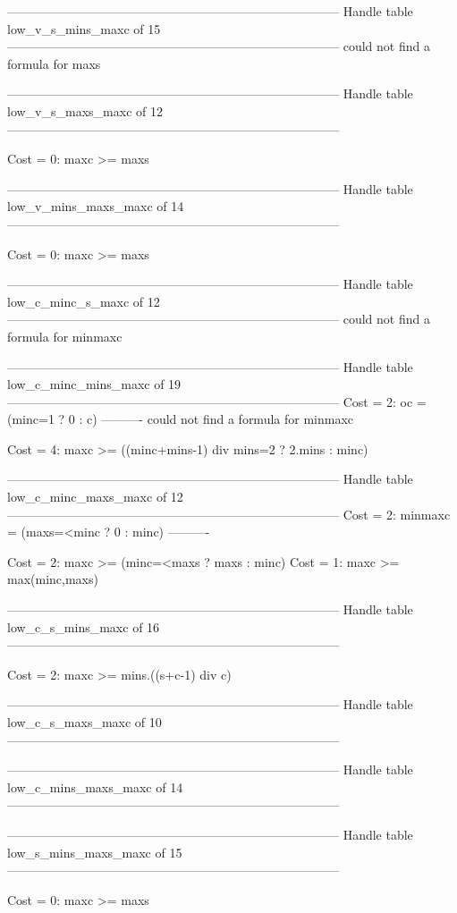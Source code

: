 --------------------------------------------------------------------------------
Handle table low_v_s_mins_maxc of 15
--------------------------------------------------------------------------------
could not find a formula for maxs


--------------------------------------------------------------------------------
Handle table low_v_s_maxs_maxc of 12
--------------------------------------------------------------------------------

Cost =  0:  maxc >= maxs

--------------------------------------------------------------------------------
Handle table low_v_mins_maxs_maxc of 14
--------------------------------------------------------------------------------

Cost =  0:  maxc >= maxs

--------------------------------------------------------------------------------
Handle table low_c_minc_s_maxc of 12
--------------------------------------------------------------------------------
could not find a formula for minmaxc


--------------------------------------------------------------------------------
Handle table low_c_minc_mins_maxc of 19
--------------------------------------------------------------------------------
Cost =  2:  oc      = (minc=1 ? 0 : c)
----------
could not find a formula for minmaxc

Cost =  4:  maxc >= ((minc+mins-1) div mins=2 ? 2.mins : minc)

--------------------------------------------------------------------------------
Handle table low_c_minc_maxs_maxc of 12
--------------------------------------------------------------------------------
Cost =  2:  minmaxc = (maxs=<minc ? 0 : minc)
----------

Cost =  2:  maxc >= (minc=<maxs ? maxs : minc)
Cost =  1:  maxc >= max(minc,maxs)

--------------------------------------------------------------------------------
Handle table low_c_s_mins_maxc of 16
--------------------------------------------------------------------------------

Cost =  2:  maxc >= mins.((s+c-1) div c)

--------------------------------------------------------------------------------
Handle table low_c_s_maxs_maxc of 10
--------------------------------------------------------------------------------


--------------------------------------------------------------------------------
Handle table low_c_mins_maxs_maxc of 14
--------------------------------------------------------------------------------


--------------------------------------------------------------------------------
Handle table low_s_mins_maxs_maxc of 15
--------------------------------------------------------------------------------

Cost =  0:  maxc >= maxs

